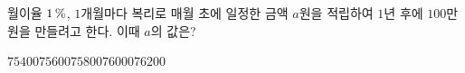 월이율 $1\mkern3mu \%$, $1$개월마다 복리로 매월 초에 일정한 금액 $a$원을 적립하여 $1$년 후에 $100$만 원을 만들려고 한다. 이때 $a$의 값은? 
\begin{choices32}{$75400$}{$75600$}{$75800$}{$76000$}{$76200$}\end{choices32}
